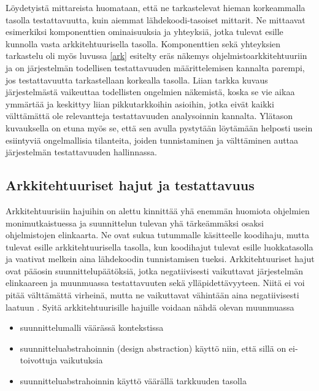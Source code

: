 \documentclass[finnish]{tktltiki2}
\theoremstyle{definition}
\theoremstyle{remark}
\begin{document}


 
Löydetyistä mittareista huomataan, että ne tarkastelevat hieman korkeammalla tasolla testattavuutta, kuin aiemmat lähdekoodi-tasoiset mittarit. Ne mittaavat esimerkiksi komponenttien ominaisuuksia ja yhteyksiä, jotka tulevat esille kunnolla vasta arkkitehtuurisella tasolla. Komponenttien sekä yhteyksien tarkastelu oli myös luvussa \ref{ark} esitelty eräs näkemys ohjelmistoarkkitehtuuriin ja on järjestelmän todellisen testattavuuden määrittelemisen kannalta parempi, jos testattavuutta tarkastellaan korkealla tasolla. Liian tarkka kuvaus järjestelmästä vaikeuttaa todellisten ongelmien näkemistä, koska se vie aikaa ymmärtää ja keskittyy liian pikkutarkkoihin asioihin, jotka eivät kaikki välttämättä ole relevantteja testattavuuden analysoinnin kannalta. Ylätason kuvauksella on etuna myös se, että sen avulla pystytään löytämään helposti usein esiintyviä ongelmallisia tilanteita, joiden tunnistaminen ja välttäminen auttaa järjestelmän testattavuuden hallinnassa.

\subsection{Arkkitehtuuriset hajut ja testattavuus}

Arkkitehtuurisiin hajuihin on alettu kinnittää yhä enemmän huomiota ohjelmien monimutkaistuessa ja suunnittelun tulevan yhä tärkeämmäksi osaksi ohjelmistojen elinkaarta. Ne ovat sukua tutummalle käsitteelle koodihaju, mutta tulevat esille arkkitehtuurisella tasolla, kun koodihajut tulevat esille luokkatasolla ja vaativat melkein aina lähdekoodin tunnistamisen tueksi. Arkkitehtuuriset hajut ovat pääosin suunnittelupäätöksiä, jotka negatiivisesti vaikuttavat järjestelmän elinkaareen ja muunmuassa testattavuuten sekä ylläpidettävyyteen. Niitä ei voi pitää välttämättä virheinä, mutta ne vaikuttavat vähintään aina negatiivisesti laatuun \citep{de_andrade_architectural_2014}. Syitä arkkitehtuurisille hajuille voidaan nähdä olevan muunmuassa 

\begin{itemize}
	\item suunnittelumalli väärässä kontekstissa
	\item suunnitteluabstrahoinnin (design abstraction) käyttö niin, että sillä on ei-toivottuja vaikutuksia
	\item suunnitteluabstrahoinnin käyttö väärällä tarkkuuden tasolla 
\end{itemize} 
\end{document}
